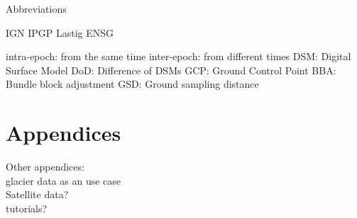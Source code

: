 \documentclass[a4paper,11pt,twoside]{ThesisStyle}
\begin{document}
\dominitoc
\tableofcontents



\mainmatter

Abbreviations

IGN
IPGP
Lastig
ENSG

intra-epoch: from the same time
inter-epoch: from different times
DSM: Digital Surface Model
DoD: Difference of DSMs
GCP: Ground Control Point
BBA: Bundle block adjustment
GSD: Ground sampling distance











\appendix

\cleardoublepage
\mtcaddpart[Appendices]
\part*{Appendices}



Other appendices:\\
glacier data as an use case\\
Satellite data?\\
tutorials?\\




\end{document}
